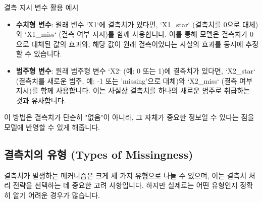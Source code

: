 \documentclass[11pt,a4paper]{article}
\begin{document}
\begin{examplebox}{결측 지시 변수 활용 예시}
\begin{itemize}
    \item \textbf{수치형 변수}: 원래 변수 `X1`에 결측치가 있다면, `X1_star` (결측치를 0으로 대체)와 `X1_miss` (결측 여부 지시)를 함께 사용합니다. 이를 통해 모델은 결측치가 0으로 대체된 값의 효과와, 해당 값이 원래 결측이었다는 사실의 효과를 동시에 추정할 수 있습니다.
    \item \textbf{범주형 변수}: 원래 범주형 변수 `X2` (예: 0 또는 1)에 결측치가 있다면, `X2_star` (결측치를 새로운 범주, 예: -1 또는 'missing'으로 대체)와 `X2_miss` (결측 여부 지시)를 함께 사용합니다. 이는 사실상 결측치를 하나의 새로운 범주로 취급하는 것과 유사합니다.
\end{itemize}
이 방법은 결측치가 단순히 "없음"이 아니라, 그 자체가 중요한 정보일 수 있다는 점을 모델에 반영할 수 있게 해줍니다.
\end{examplebox}

\subsection*{결측치의 유형 (Types of Missingness)}
결측치가 발생하는 메커니즘은 크게 세 가지 유형으로 나눌 수 있으며, 이는 결측치 처리 전략을 선택하는 데 중요한 고려 사항입니다. 하지만 실제로는 어떤 유형인지 정확히 알기 어려운 경우가 많습니다.
\end{document}
